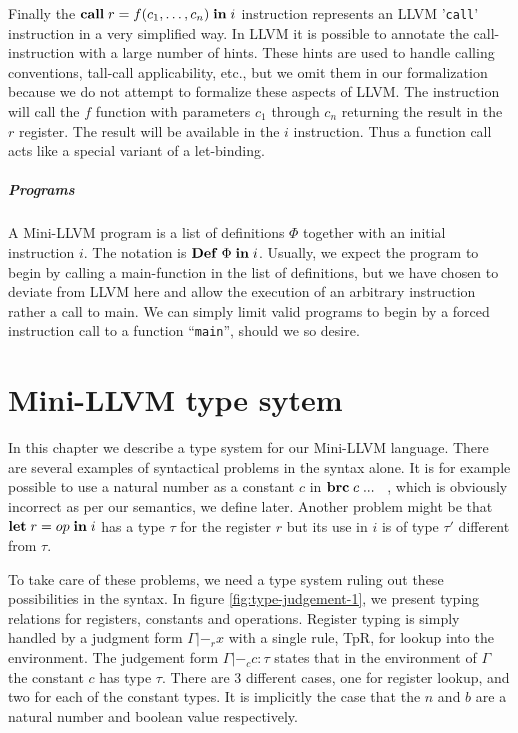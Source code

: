 \documentclass[a4paper, oneside, 10pt, draft]{memoir}
\begin{document}
Finally the $\mathbf{call} \; r = f (c_1, \dotsc, c_n)\; \mathbf{in} \; i$ instruction
represents an LLVM '\texttt{call}' instruction in a very simplified
way. In LLVM it is possible to annotate the call-instruction with a
large number of hints. These hints are used to handle calling
conventions, tall-call applicability, etc., but we omit them in our
formalization because we do not attempt to formalize these aspects of
LLVM. The instruction will call the $f$ function with parameters $c_1$
through $c_n$ returning the result in the $r$ register. The result
will be available in the $i$ instruction. Thus a function call acts
like a special variant of a let-binding.

\paragraph{Programs}

A Mini-LLVM program is a list of definitions $\Phi$ together with an
initial instruction $i$. The notation is $\mathbf{Def} \; \Phi \; \mathbf{in} \; i$. Usually, we
expect the program to begin by calling a main-function in the list of
definitions, but we have chosen to deviate from LLVM here and allow
the execution of an arbitrary instruction rather a call to main. We
can simply limit valid programs to begin by a forced instruction
call to a function ``\texttt{main}'', should we so desire.

\chapter{Mini-LLVM type sytem}

In this chapter we describe a type system for our Mini-LLVM
language. There are several examples of syntactical problems in the
syntax alone. It is for example possible to use a natural number as a
constant $c$ in $\mathbf{brc} \; c \; ... \;  \;  \;$, which is obviously incorrect as
per our semantics, we define later. Another problem might be that
$\mathbf{let} \; r = op \; \mathbf{in} \; i$ has a type $\tau$ for the register $r$ but its use
in $i$ is of type $\tau'$ different from $\tau$.

\newcommand{\tpr}{|-_{r}}
\newcommand{\tpc}{|-_{c}}
\newcommand{\tpop}{|-_{o}}
\newcommand{\tpb}{|-_{b}}

To take care of these problems, we need a type system ruling out these
possibilities in the syntax. In figure \ref{fig:type-judgement-1}, we
present typing relations for registers, constants and
operations. Register typing is simply handled by a judgment form
$\boxed{\Gamma \tpr x}$ with a single rule, TpR, for lookup into the
environment. The judgement form $\boxed{\Gamma \tpc c : \tau}$ states
that in the environment of $\Gamma$ the constant $c$ has type
$\tau$. There are 3 different cases, one for register lookup, and two
for each of the constant types. It is implicitly the case that the $n$
and $b$ are a natural number and boolean value respectively.
\end{document}
